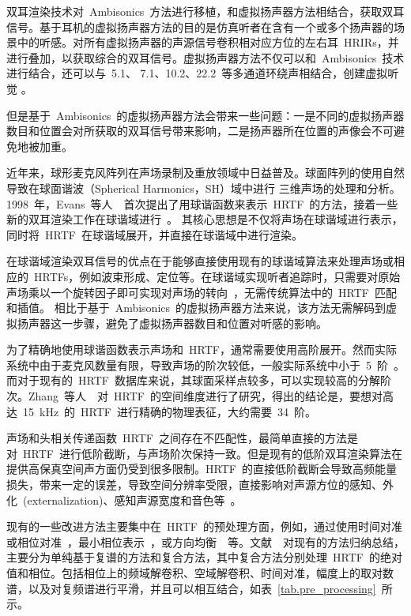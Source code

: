 双耳渲染技术对~Ambisonics~方法进行移植，和虚拟扬声器方法相结合，获取双耳信号。基于耳机的虚拟扬声器方法的目的是仿真听者在含有一个或多个扬声器的场景中的听感。对所有虚拟扬声器的声源信号卷积相对应方位的左右耳~HRIRs，并进行叠加，以获取综合的双耳信号。虚拟扬声器方法不仅可以和~Ambisonics~技术进行结合，还可以与~5.1、 7.1、10.2、22.2~等多通道环绕声相结合，创建虚拟听觉 。

但是基于~Ambisonics~的虚拟扬声器方法会带来一些问题：一是不同的虚拟扬声器数目和位置会对所获取的双耳信号带来影响，二是扬声器所在位置的声像会不可避免地被加重。

近年来，球形麦克风阵列在声场录制及重放领域中日益普及。球面阵列的使用自然导致在球面谐波（Spherical Harmonics，SH）域中进行 三维声场的处理和分析。
1998~年，Evans~等人~~首次提出了用球谐函数来表示~HRTF~的方法，接着一些新的双耳渲染工作在球谐域进行~。
其核心思想是不仅将声场在球谐域进行表示，同时将~HRTF~在球谐域展开，并直接在球谐域中进行渲染。

在球谐域渲染双耳信号的优点在于能够直接使用现有的球谐域算法来处理声场或相应的~HRTFs，例如波束形成、定位等。在球谐域实现听者追踪时，只需要对原始声场乘以一个旋转因子即可实现对声场的转向~，无需传统算法中的~HRTF~匹配和插值。
相比于基于~Ambisonics~的虚拟扬声器方法来说，该方法无需解码到虚拟扬声器这一步骤，避免了虚拟扬声器数目和位置对听感的影响。

为了精确地使用球谐函数表示声场和~HRTF，通常需要使用高阶展开。然而实际系统中由于麦克风数量有限，导致声场的阶次较低，一般实际系统中小于~5~阶~。而对于现有的~HRTF~数据库来说，其球面采样点较多，可以实现较高的分解阶次。Zhang~等人~~对~HRTF~的空间维度进行了研究，得出的结论是，要想对高达~15~kHz~的~HRTF~进行精确的物理表征，大约需要~34~阶。

声场和头相关传递函数~HRTF~之间存在不匹配性，最简单直接的方法是对~HRTF~进行低阶截断，与声场阶次保持一致。但是现有的低阶双耳渲染算法在提供高保真空间声方面仍受到很多限制。HRTF~的直接低阶截断会导致高频能量损失，带来一定的误差，导致空间分辨率受限，直接影响对声源方位的感知、外化~(externalization)、感知声源宽度和音色等~。

现有的一些改进方法主要集中在~HRTF~的预处理方面，例如，通过使用时间对准或相位对准~，最小相位表示~，或方向均衡~~等。文献~\cite{2018comparison}~对现有的方法归纳总结，主要分为单纯基于复谱的方法和复合方法，其中复合方法分别处理~HRTF~的绝对值和相位。包括相位上的频域解卷积、空域解卷积、时间对准，幅度上的取对数谱，以及对复频谱进行平滑，并且可以相互结合，如表~\ref{tab.pre_processing}~所示。


